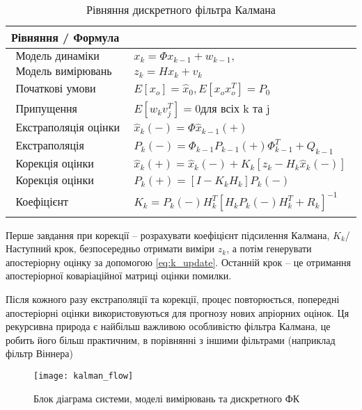 \begin{table}[here]
\small
\caption{Рівняння дискретного фільтра Калмана}
\centering
\begin{tabular}{|p{160mm}|} \hline 


Рівняння / Формула \\ \hline 
\begin{eqnarray} 
\text{Модель динаміки системи}  &  \label{eq:kalman_1} x_{k} = \Phi x_{k-1} + w_{k-1}, \\  
\text{Модель вимірювань}  & \label{eq:kalman_2} z_{k} = Hx_{k} +v_{k} \\ 
\text{Початкові умови}  &\label{eq:kalman_3} E[x_{o}] = \hat{x}_{0}, E[x_{o} x_{o}^{T}] = P_{0} \\
\text{Припущення незалежності}  &  \label{eq:kalman_4} E[w_{k} v_{j}^{T}] = 0 \text{для всіх k та j} \\
\text{Екстраполяція оцінки (прогноз)}  &  \label{eq:kalman_5} \hat{x}_{k}(-) = \Phi \hat{x}_{k-1}(+)\\
\text{Екстраполяція коваріації}  &  \label{eq:kalman_6} P_{k}(-) = \Phi_{k-1} P_{k-1}(+)\Phi_{k-1}^{T} + Q_{k-1} \\ 
\text{Корекція оцінки}  &  \label{eq:kalman_7} \hat{x}_{k}(+) = \hat{x}_{k}(-) + K_{k}[z_{k}-H_{k}\hat{x}_{k}(-)]\\
\text{Корекція оцінки коваріації}  &  \label{eq:kalman_8} P_{k}(+) = [I - K_{k}H_{k}]P_{k}(-)\\
\text{Коефіцієнт підсилення Калмана}   &  \label{eq:kalman_9} K_{k}= P_{k}(-)H_{k}^{T}[H_{k}P_{k}(-)H_{k}^{T} + R_{k}]^{-1}  
\end{eqnarray} 
\\  \hline
\end{tabular}
\label{tb:ac}
\end{table}
Перше завдання при корекції -- розрахувати коефіцієнт підсилення Калмана, $K_{k}$/
Наступний крок, безпосередньо отримати виміри $z_{k}$, а потім генерувати 
апостеріорну оцінку за допомогою \eqref{eq:k_update}. Останній крок  -- це 
отримання апостеріорної коваріаційної матриці оцінки помилки.

Після кожного разу екстраполяції та корекції, процес повторюється, попередні
апостеріорні оцінки використовуються для прогнозу нових апріорних оцінок.
Ця рекурсивна природа є найбільш важливою особливістю фільтра Калмана, це робить
його більш практичним, в порівнянні з іншими фільтрами (наприклад фільтр Віннера)
\begin{figure}[here]
\centering
\texttt{[image: kalman\_flow]}
\caption{Блок діаграма системи, моделі вимірювань та дискретного ФК}
\label{fig:kalman_flow}
\end{figure} 


